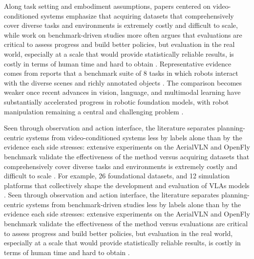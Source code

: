 \documentclass[a4paper,11pt]{article}
\begin{document}
Along task setting and embodiment assumptions, papers centered on video-conditioned systems emphasize that acquiring datasets that comprehensively cover diverse tasks and environments is extremely costly and difficult to scale, while work on benchmark-driven studies more often argues that evaluations are critical to assess progress and build better policies, but evaluation in the real world, especially at a scale that would provide statistically reliable results, is costly in terms of human time and hard to obtain \citep{Dai2026Conla,Xu2025Aerial,Zhou2025Autoeval,Kachaev2025Mind}. Representative evidence comes from reports that a benchmark suite of 8 tasks in which robots interact with the diverse scenes and richly annotated objects \citep{Kim2026Molmospaces}. The comparison becomes weaker once recent advances in vision, language, and multimodal learning have substantially accelerated progress in robotic foundation models, with robot manipulation remaining a central and challenging problem \citep{Bai2025Embodied}.

Seen through observation and action interface, the literature separates planning-centric systems from video-conditioned systems less by labels alone than by the evidence each side stresses: extensive experiments on the AerialVLN and OpenFly benchmark validate the effectiveness of the method versus acquiring datasets that comprehensively cover diverse tasks and environments is extremely costly and difficult to scale \citep{Xu2025Aerial,Kachaev2025Mind,Dai2026Conla}. For example, 26 foundational datasets, and 12 simulation platforms that collectively shape the development and evaluation of VLAs models \citep{Din2025Vision}. Seen through observation and action interface, the literature separates planning-centric systems from benchmark-driven studies less by labels alone than by the evidence each side stresses: extensive experiments on the AerialVLN and OpenFly benchmark validate the effectiveness of the method versus evaluations are critical to assess progress and build better policies, but evaluation in the real world, especially at a scale that would provide statistically reliable results, is costly in terms of human time and hard to obtain \citep{Xu2025Aerial,Kachaev2025Mind,Zhou2025Autoeval}.
\end{document}
